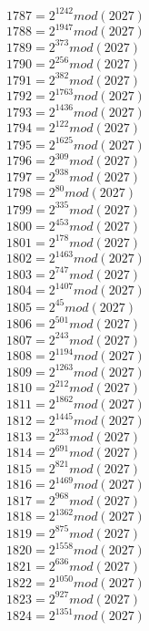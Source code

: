 \documentclass[12pt, letterpaper]{article}
\begin{document}
\begin{itemize}
\begin{multicols}{3}
$1787= 2^{1242} mod (2027)$\\
$1788= 2^{1947} mod (2027)$\\
$1789= 2^{373} mod (2027)$\\
$1790= 2^{256} mod (2027)$\\
$1791= 2^{382} mod (2027)$\\
$1792= 2^{1763} mod (2027)$\\
$1793= 2^{1436} mod (2027)$\\
$1794= 2^{122} mod (2027)$\\
$1795= 2^{1625} mod (2027)$\\
$1796= 2^{309} mod (2027)$\\
$1797= 2^{938} mod (2027)$\\
$1798= 2^{80} mod (2027)$\\
$1799= 2^{335} mod (2027)$\\
$1800= 2^{453} mod (2027)$\\
$1801= 2^{178} mod (2027)$\\
$1802= 2^{1463} mod (2027)$\\
$1803= 2^{747} mod (2027)$\\
$1804= 2^{1407} mod (2027)$\\
$1805= 2^{45} mod (2027)$\\
$1806= 2^{501} mod (2027)$\\
$1807= 2^{243} mod (2027)$\\
$1808= 2^{1194} mod (2027)$\\
$1809= 2^{1263} mod (2027)$\\
$1810= 2^{212} mod (2027)$\\
$1811= 2^{1862} mod (2027)$\\
$1812= 2^{1445} mod (2027)$\\
$1813= 2^{233} mod (2027)$\\
$1814= 2^{691} mod (2027)$\\
$1815= 2^{821} mod (2027)$\\
$1816= 2^{1469} mod (2027)$\\
$1817= 2^{968} mod (2027)$\\
$1818= 2^{1362} mod (2027)$\\
$1819= 2^{875} mod (2027)$\\
$1820= 2^{1558} mod (2027)$\\
$1821= 2^{636} mod (2027)$\\
$1822= 2^{1050} mod (2027)$\\
$1823= 2^{927} mod (2027)$\\
$1824= 2^{1351} mod (2027)$\\

\end{multicols}
\end{itemize}
\end{document}
